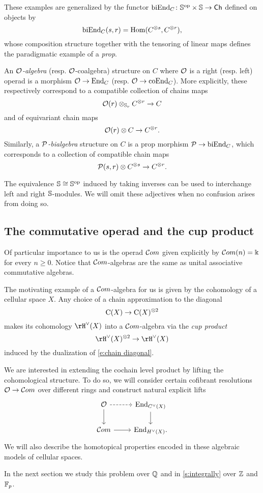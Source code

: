 These examples are generalized by the functor $\mathrm{biEnd}_C \colon \mathbb{S}^{\mathrm{op}} \times \mathbb{S} \to \mathsf{Ch}$ defined on objects by
\[
\mathrm{biEnd}_C(s,r) = \mathrm{Hom}(C^{\otimes s}, C^{\otimes r}),
\]
whose composition structure together with the tensoring of linear maps defines the paradigmatic example of a \textit{prop}.

An \textit{$\mathcal{O}$-algebra} (resp. $\mathcal{O}$-coalgebra) structure on $C$ where $\mathcal{O}$ is a right (resp. left) operad is a morphism $\mathcal{O} \to \mathrm{End}_C$ (resp. $\mathcal{O} \to \mathrm{coEnd}_C$).
More explicitly, these respectively correspond to a compatible collection of chains maps
\[
\mathcal{O}(r) \otimes_{\mathbb{S}_r} C^{\otimes r} \to C
\]
and of equivariant chain maps
\[
\mathcal{O}(r) \otimes C \to C^{\otimes r}.
\]
Similarly, a \textit{$\mathcal{P}$-bialgebra} structure on $C$ is a prop morphism $\mathcal{P} \to \mathrm{biEnd}_C$, which corresponds to a collection of compatible chain maps
\[
\mathcal{P}(s,r) \otimes C^{\otimes s} \to C^{\otimes r}.
\]

The equivalence $\mathbb{S} \cong \mathbb{S}^{\mathrm{op}}$ induced by taking inverses can be used to interchange left and right $\mathbb{S}$-modules.
We will omit these adjectives when no confusion arises from doing so.

\subsection{The commutative operad and the cup product}

Of particular importance to us is the operad $\mathcal{C}om$ given explicitly by $\mathcal{C}om(n) = \Bbbk$ for every $n \geq 0$.
Notice that $\mathcal{C}om$-algebras are the same as unital associative commutative algebras.

The motivating example of a $\mathcal{C}om$-algebra for us is given by the cohomology of a cellular space $X$.
Any choice of a chain approximation to the diagonal
\begin{equation} \label{e:chain diagonal}
\operatorname{C}(X) \to \operatorname{C}(X)^{\otimes 2}
\end{equation}
makes its cohomology $\rH^\vee(X)$ into a $\mathcal{C}om$-algebra via the \textit{cup product}
\[
\rH^\vee(X)^{\otimes 2} \to \rH^\vee(X)
\]
induced by the dualization of \eqref{e:chain diagonal}.

We are interested in extending the cochain level product by lifting the cohomological structure.
To do so, we will consider certain cofibrant resolutions $\mathcal{O} \to \mathcal{C}om$ over different rings and construct natural explicit lifts
\[
\begin{tikzcd}
\cO \arrow[r, dashed] \arrow[d] &
\End_{C^\vee(X)} \arrow[d] \\
\com \arrow[r] &
\End_{H^\vee(X)}.
\end{tikzcd}
\]
We will also describe the homotopical properties encoded in these algebraic models of cellular spaces.

In the next section we study this problem over $\mathbb{Q}$ and in \cref{s:integrally} over $\mathbb{Z}$ and ${\mathbb{F}_p}$.